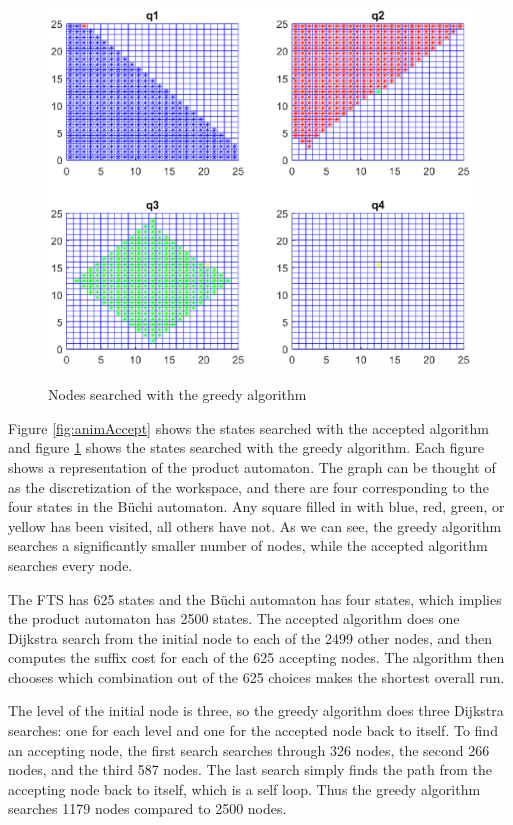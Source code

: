 \begin{figure}[!htb]
\centering
\includegraphics[scale=0.7]{ourPlot}
\label{fig:animOur}
\caption{Nodes searched with the greedy algorithm}
\end{figure}

Figure \ref{fig:animAccept} shows the states searched with the accepted algorithm and figure \ref{fig:animOur} shows the states searched with the greedy algorithm. Each figure shows a representation of the product automaton. The graph can be thought of as the discretization of the workspace, and there are four corresponding to the four states in the B\"uchi automaton. Any square filled in with blue, red, green, or yellow has been visited, all others have not. As we can see, the greedy algorithm searches a significantly smaller number of nodes, while the accepted algorithm searches every node.

The FTS has 625 states and the B\"uchi automaton has four states, which implies the product automaton has 2500 states. The accepted algorithm does one Dijkstra search from the initial node to each of the 2499 other nodes, and then computes the suffix cost for each of the 625 accepting nodes. The algorithm then chooses which combination out of the 625 choices makes the shortest overall run. 

The level of the initial node is three, so the greedy algorithm does three Dijkstra searches: one for each level and one for the accepted node back to itself. To find an accepting node, the first search searches through 326 nodes, the second 266 nodes, and the third 587 nodes. The last search simply finds the path from the accepting node back to itself, which is a self loop. Thus the greedy algorithm searches 1179 nodes compared to 2500 nodes.  

